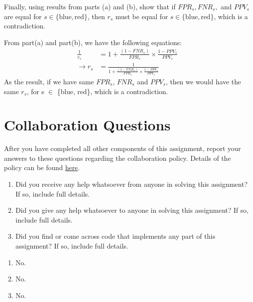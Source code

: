 \documentclass[11pt,addpoints,answers]{exam}
\begin{document}
\begin{questions}
\begin{parts}
\begin{subparts}
    \subpart[4] Finally, using results from parts (a) and (b), show that if $FPR_s, FNR_s,$ and $PPV_s$ are equal for $s \in \{\text{blue}, \text{red}\}$, then $r_s$ must be equal for $s \in \{\text{blue}, \text{red}\}$, which is a contradiction.

    \begin{your_solution}[width = \linewidth,height=10cm]
    From part(a) and part(b), we have the following equations:
    \begin{align}
	\frac{1}{r_s} &= 1 + \frac{(1-FNR_s)}{FPR_s} \times \frac{1-PPV_s}{PPV_s} \\
	\rightarrow r_s &= \frac{1}{1 + \frac{(1-FNR_s)}{FPR_s} \times \frac{1-PPV_s}{PPV_s}}
	\end{align}    
	As the result, if we have same $FPR_s$, $FNR_s$ and $PPV_s$, then we would have the same $r_s$, for s $\in$ \{blue, red\}, which is a contradiction.
    \end{your_solution}
\end{subparts}


\end{parts} 
\newpage
\section{Collaboration Questions}
After you have completed all other components of this assignment, report your answers to these questions regarding the collaboration policy. Details of the policy can be found \href{http://www.cs.cmu.edu/~mgormley/courses/10601/syllabus.html}{here}.
\begin{enumerate}
    \item Did you receive any help whatsoever from anyone in solving this assignment? If so, include full details.
    \item Did you give any help whatsoever to anyone in solving this assignment? If so, include full details.
    \item Did you find or come across code that implements any part of this assignment? If so, include full details.
\end{enumerate}

\begin{your_solution}[height=6cm]
\begin{enumerate}
    \item No.
	\item No.
	\item No.
\end{enumerate}	
\end{your_solution}
\end{questions}
\end{document}
